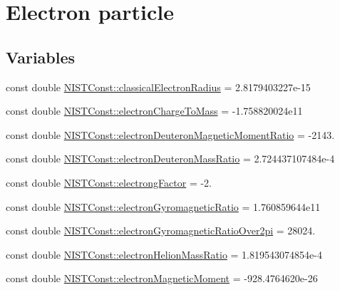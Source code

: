 \hypertarget{group___n_i_s_t_const-_electron}{}\section{Electron particle}
\label{group___n_i_s_t_const-_electron}
\subsection*{Variables}
\begin{DoxyCompactItemize}
\item 
const double \mbox{\hyperlink{group___n_i_s_t_const-_electron_gac67d6a01d8d75cb66290a36f7123942b}{N\+I\+S\+T\+Const\+::classical\+Electron\+Radius}} = 2.\+8179403227e-\/15
\item 
const double \mbox{\hyperlink{group___n_i_s_t_const-_electron_ga941e6299b6ef4b90cc525c335d9989dc}{N\+I\+S\+T\+Const\+::electron\+Charge\+To\+Mass}} = -\/1.\+758820024e11
\item 
const double \mbox{\hyperlink{group___n_i_s_t_const-_electron_ga3dea53b57010903586a46d81a49fc80f}{N\+I\+S\+T\+Const\+::electron\+Deuteron\+Magnetic\+Moment\+Ratio}} = -\/2143.
\item 
const double \mbox{\hyperlink{group___n_i_s_t_const-_electron_gad526d455579237804ce6194b50782c0e}{N\+I\+S\+T\+Const\+::electron\+Deuteron\+Mass\+Ratio}} = 2.\+724437107484e-\/4
\item 
const double \mbox{\hyperlink{group___n_i_s_t_const-_electron_ga65a20f263f8ef8f324ea6d1879050a66}{N\+I\+S\+T\+Const\+::electrong\+Factor}} = -\/2.
\item 
const double \mbox{\hyperlink{group___n_i_s_t_const-_electron_ga7c738b9078ca0308ee45d3b8bbafadb6}{N\+I\+S\+T\+Const\+::electron\+Gyromagnetic\+Ratio}} = 1.\+760859644e11
\item 
const double \mbox{\hyperlink{group___n_i_s_t_const-_electron_ga67e6ebbd2c2d8043cbdb09979dc7247b}{N\+I\+S\+T\+Const\+::electron\+Gyromagnetic\+Ratio\+Over2pi}} = 28024.
\item 
const double \mbox{\hyperlink{group___n_i_s_t_const-_electron_ga5039598cd8a51d15d9dfbb0463c109d6}{N\+I\+S\+T\+Const\+::electron\+Helion\+Mass\+Ratio}} = 1.\+819543074854e-\/4
\item 
const double \mbox{\hyperlink{group___n_i_s_t_const-_electron_ga81fc83bd665b7b4fb83e9901ed7d6628}{N\+I\+S\+T\+Const\+::electron\+Magnetic\+Moment}} = -\/928.\+4764620e-\/26
\item 

\end{DoxyCompactItemize}
